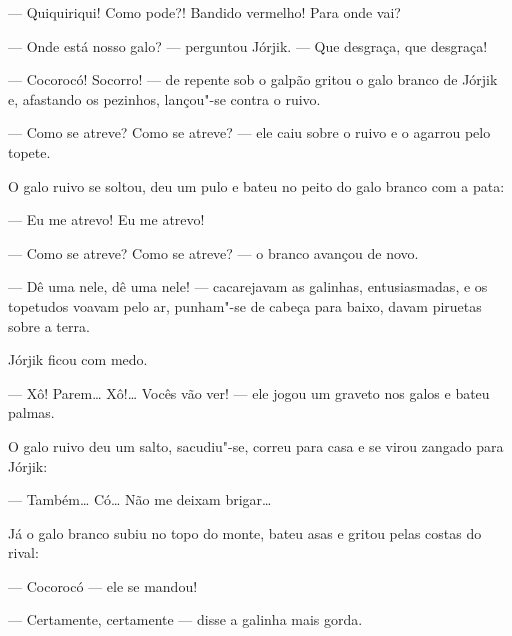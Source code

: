 --- Quiquiriqui! Como pode?! Bandido vermelho! Para onde vai?

--- Onde está nosso galo? --- perguntou Jórjik. --- Que desgraça, que
desgraça!

--- Cocorocó! Socorro! --- de repente sob o galpão gritou o galo branco
de Jórjik e, afastando os pezinhos, lançou"-se contra o ruivo.

--- Como se atreve? Como se atreve? --- ele caiu sobre o ruivo e o
agarrou pelo topete.

O galo ruivo se soltou, deu um pulo e bateu no peito do galo branco com
a pata:

--- Eu me atrevo! Eu me atrevo!

--- Como se atreve? Como se atreve? --- o branco avançou de novo.

--- Dê uma nele, dê uma nele! --- cacarejavam as galinhas,
entusiasmadas, e os topetudos voavam pelo ar, punham"-se de cabeça para
baixo, davam piruetas sobre a terra.

Jórjik ficou com medo.

--- Xô! Parem\ldots{} Xô!\ldots{} Vocês vão ver! --- ele jogou um graveto nos
galos e bateu palmas.

O galo ruivo deu um salto, sacudiu"-se, correu para casa e se virou
zangado para Jórjik:

--- Também\ldots{} Có\ldots{} Não me deixam brigar\ldots{}

Já o galo branco subiu no topo do monte, bateu asas e gritou pelas
costas do rival:

--- Cocorocó --- ele se mandou!

--- Certamente, certamente --- disse a galinha mais gorda.

